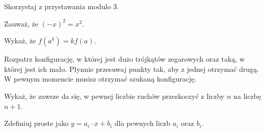 
\begin{hints_list}
	\item Skorzystaj z przystawania modulo $3$.
	\item Zauważ, że $(-x)^2 = x^2$.
	\item Wykaż, że $f(a^k) = kf(a)$.
	\item Rozpatrz konfigurację, w której jest dużo trójkątów zegarowych oraz taką, w której jest ich mało. Płynnie przesuwaj punkty tak, aby z jednej otrzymać drugą. W pewnym momencie musisz otrzymać szukaną konfigurację.
	\item Wykaż, że zawsze da się, w pewnej liczbie ruchów przeskoczyć z liczby $n$ na liczbę $n + 1$.
	\item Zdefiniuj proste jako $y = a_i \cdot x + b_i$ dla pewnych liczb $a_i$ oraz $b_i.$
\end{hints_list}